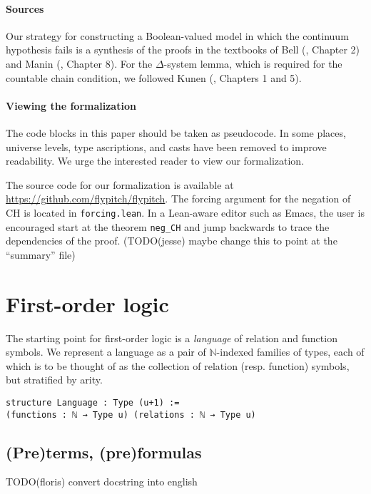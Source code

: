 \documentclass[a4paper,USenglish,cleveref, autoref]{lipics-v2019}
\newcommand{\N}{\mathbb{N}}
\begin{document}
\paragraph*{Sources}
Our strategy for constructing a Boolean-valued model in which the continuum hypothesis fails is a synthesis of the proofs in the textbooks of Bell (\cite{bell1}, Chapter 2) and Manin (\cite{manin1}, Chapter 8). For the $\Delta$-system lemma, which is required for the countable chain condition, we followed Kunen (\cite{kunen1}, Chapters 1 and 5).

\paragraph*{Viewing the formalization}
The code blocks in this paper should be taken as pseudocode. In some places, universe levels, type ascriptions, and casts have been removed to improve readability. We urge the interested reader to view our formalization.

The source code for our formalization is available at \url{https://github.com/flypitch/flypitch}. The forcing argument for the negation of CH is located in \lstinline{forcing.lean}. In a Lean-aware editor such as Emacs, the user is encouraged start at the theorem \lstinline{neg_CH} and jump backwards to trace the dependencies of the proof. (TODO(jesse) maybe change this to point at the ``summary'' file)


\section{First-order logic}
\label{sect:fol}
The starting point for first-order logic is a \emph{language} of relation and function symbols. We represent a language as a pair of $\N$-indexed families of types, each of which is to be thought of as the collection of relation (resp. function) symbols, but stratified by arity.

\begin{lstlisting}
structure Language : Type (u+1) :=
(functions : ℕ → Type u) (relations : ℕ → Type u)
\end{lstlisting}

\subsection{(Pre)terms, (pre)formulas}
TODO(floris) convert docstring into english
\end{document}
